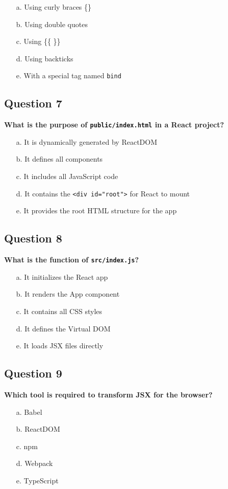 \documentclass{article}
\begin{document}
\begin{itemize}
  \item[a.] Using curly braces \{\}
  \item[b.] Using double quotes
  \item[c.] Using \{\{ \}\}
  \item[d.] Using backticks
  \item[e.] With a special tag named \texttt{bind}
\end{itemize}

\subsection*{Question 7}
\textbf{What is the purpose of \texttt{public/index.html} in a React project?}

\begin{itemize}
  \item[a.] It is dynamically generated by ReactDOM
  \item[b.] It defines all components
  \item[c.] It includes all JavaScript code
  \item[d.] It contains the \texttt{<div id="root">} for React to mount
  \item[e.] It provides the root HTML structure for the app
\end{itemize}

\subsection*{Question 8}
\textbf{What is the function of \texttt{src/index.js}?}

\begin{itemize}
  \item[a.] It initializes the React app
  \item[b.] It renders the App component
  \item[c.] It contains all CSS styles
  \item[d.] It defines the Virtual DOM
  \item[e.] It loads JSX files directly
\end{itemize}

\subsection*{Question 9}
\textbf{Which tool is required to transform JSX for the browser?}

\begin{itemize}
  \item[a.] Babel
  \item[b.] ReactDOM
  \item[c.] npm
  \item[d.] Webpack
  \item[e.] TypeScript
\end{itemize}
\end{document}
